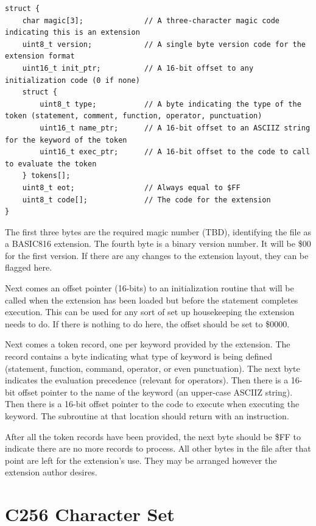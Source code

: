 \documentclass{report}
\begin{document}
    \begin{verbatim}
struct {
    char magic[3];              // A three-character magic code indicating this is an extension
    uint8_t version;            // A single byte version code for the extension format
    uint16_t init_ptr;          // A 16-bit offset to any initialization code (0 if none)
    struct {
        uint8_t type;           // A byte indicating the type of the token (statement, comment, function, operator, punctuation)
        uint16_t name_ptr;      // A 16-bit offset to an ASCIIZ string for the keyword of the token
        uint16_t exec_ptr;      // A 16-bit offset to the code to call to evaluate the token
    } tokens[];
    uint8_t eot;                // Always equal to $FF
    uint8_t code[];             // The code for the extension
}
    \end{verbatim}

    The first three bytes are the required magic number (TBD), identifying the file as a BASIC816 extension.
    The fourth byte is a binary version number. It will be \$00 for the first version. If there are any changes to the extension
    layout, they can be flagged here.
    
    Next comes an offset pointer (16-bits) to an initialization routine that will be called when the extension has been loaded
    but before the  statement completes execution. This can be used for any sort of set up housekeeping the
    extension needs to do. If there is nothing to do here, the offset should be set to \$0000.
    
    Next comes a token record, one per keyword provided by the extension. The record contains a byte indicating what type
    of keyword is being defined (statement, function, command, operator, or even punctuation). The next byte indicates the
    evaluation precedence (relevant for operators). Then there is a 16-bit offset pointer to the name of the keyword (an
    upper-case ASCIIZ string). Then there is a 16-bit offset pointer to the code to execute when executing the keyword. The
    subroutine at that location should return with an  instruction.
    
    After all the token records have been provided, the next byte should be \$FF to indicate there are no more records to process.
    All other bytes in the file after that point are left for the extension's use. They may be arranged however the extension
    author desires.

    \section*{C256 Character Set}
\end{document}
